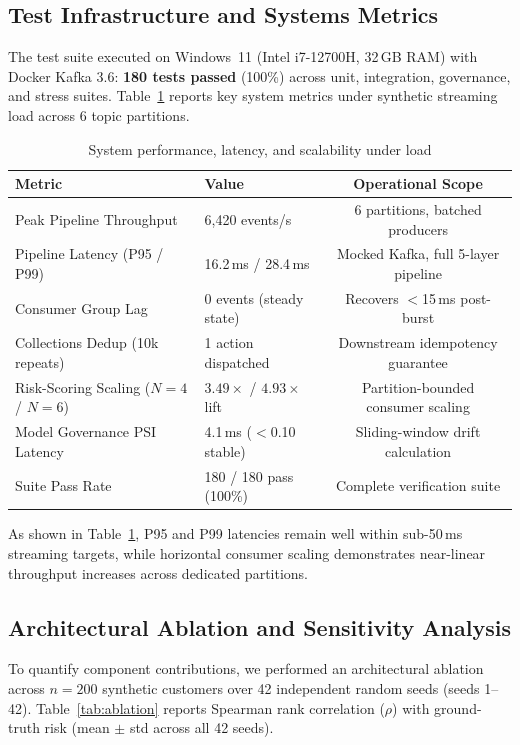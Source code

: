 \documentclass[runningheads]{llncs}
\begin{document}
\subsection{Test Infrastructure and Systems Metrics}
The test suite executed on Windows~11 (Intel i7-12700H, 32\,GB RAM) with Docker Kafka 3.6: \textbf{180 tests passed} (100\%) across unit, integration, governance, and stress suites. Table~\ref{tab:perf} reports key system metrics under synthetic streaming load across 6 topic partitions.
\begin{table}[htbp]
\caption{System performance, latency, and scalability under load}
\label{tab:perf}
\centering\scriptsize
\begin{tabular}{@{}llc@{}}
\toprule
\textbf{Metric} & \textbf{Value} & \textbf{Operational Scope} \\
\midrule
Peak Pipeline Throughput & 6,420 events/s & 6 partitions, batched producers \\
Pipeline Latency (P95 / P99) & 16.2\,ms / 28.4\,ms & Mocked Kafka, full 5-layer pipeline \\
Consumer Group Lag & 0 events (steady state) & Recovers $<$15\,ms post-burst \\
Collections Dedup (10k repeats) & 1 action dispatched & Downstream idempotency guarantee \\
Risk-Scoring Scaling ($N{=}4$ / $N{=}6$) & $3.49\times$ / $4.93\times$ lift & Partition-bounded consumer scaling \\
Model Governance PSI Latency & 4.1\,ms ($<$0.10 stable) & Sliding-window drift calculation \\
Suite Pass Rate & 180 / 180 pass (100\%) & Complete verification suite \\
\bottomrule
\end{tabular}
\end{table}
As shown in Table~\ref{tab:perf}, P95 and P99 latencies remain well within sub-50\,ms streaming targets, while horizontal consumer scaling demonstrates near-linear throughput increases across dedicated partitions.

\subsection{Architectural Ablation and Sensitivity Analysis}
\label{sec:ablation}

To quantify component contributions, we performed an architectural ablation across $n{=}200$ synthetic customers over 42 independent random seeds (seeds 1--42). Table~\ref{tab:ablation} reports Spearman rank correlation ($\rho$) with ground-truth risk (mean $\pm$ std across all 42 seeds). 
\end{document}
